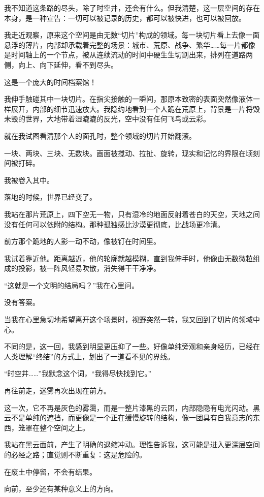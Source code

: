 我不知道这条路的尽头，除了时空井，还会有什么。但我清楚，这一层空间的存在本身，是一种宣告：一切可以被记录的历史，都可以被快进，也可以被回放。

我走近观察，原来这个空间是由无数“切片”构成的领域。每一块切片看上去像一面悬浮的薄片，内部却承载着完整的场景：城市、荒原、战争、繁华……每一片都像是时间轴上的一个节点，被从连续流动的时间中硬生生切割出来，排列在道路两侧，向上、向下延伸，看不到尽头。

这是一个庞大的时间档案馆！

我伸手触碰其中一块切片。在指尖接触的一瞬间，那原本致密的表面突然像液体一样展开，内部的细节迅速放大。我隐约地看到一个人跪在荒原上，背景是一片将毁未毁的世界，大地带着湿漉漉的反光，空中没有任何飞鸟或云彩。

就在我试图看清那个人的面孔时，整个领域的切片开始翻滚。

一块、两块、三块、无数块。画面被搅动、拉扯、旋转，现实和记忆的界限在顷刻间被打碎。

我被卷入其中。

落地的时候，世界已经变了。

我站在那片荒原上，四下空无一物，只有湿冷的地面反射着苍白的天空，天地之间没有任何可以依附的结构。那种孤独感比沙漠更彻底，比战场更冷清。

前方那个跪地的人影一动不动，像被钉在时间里。

我试着靠近他。距离越近，他的轮廓就越模糊，直到我伸手时，他像由无数微粒组成的投影，被一阵风轻易吹散，消失得干干净净。

“这就是一个文明的结局吗？”我在心里问。

没有答案。

当我在心里急切地希望离开这个场景时，视野突然一转，我又回到了切片的领域中心。

不同的是，这一回，我感到明显更压抑了一些。好像单纯旁观和亲身经历，已经在人类理解“终结”的方式上，划出了一道看不见的界线。

“时空井……”我默念这个词，“我得尽快找到它。”

再往前走，迷雾再次出现在前方。

这一次，它不再是灰色的雾霭，而是一整片漆黑的云团，内部隐隐有电光闪动。黑云不是单纯的遮挡，而更像是一个正在缓慢旋转的结构，像一团具有自我意志的东西，笼罩在整个空间之上。

我站在黑云面前，产生了明确的退缩冲动。理性告诉我，这可能是进入更深层空间的必经之路；直觉则不断重复：这是危险的。

在废土中停留，不会有结果。

向前，至少还有某种意义上的方向。

